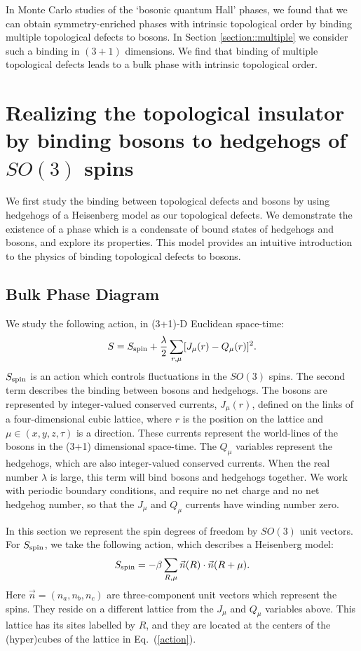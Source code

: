 \documentclass[prb,twocolumn]{revtex4-1}
\begin{document}
In Monte Carlo studies of the `bosonic quantum Hall' phases, we found that we can obtain symmetry-enriched phases with intrinsic topological order by binding multiple topological defects to bosons. In Section \ref{section::multiple} we consider such a binding in $(3+1)$ dimensions. We find that binding of multiple topological defects leads to a bulk phase with intrinsic topological order.

\section{Realizing the topological insulator by binding bosons to hedgehogs of $SO(3)$ spins}
\label{section::Heisenberg}

We first study the binding between topological defects and bosons by using hedgehogs of a Heisenberg model as our topological defects. We demonstrate the existence of a phase which is a condensate of bound states of hedgehogs and bosons, and explore its properties. This model provides an intuitive introduction to the physics of binding topological defects to bosons. 

\subsection{Bulk Phase Diagram}
\label{subsec::bulkheis}
We study the following action, in (3+1)-D Euclidean space-time:
\begin{equation}
S=S_{\rm spin}+\frac{\lambda}{2}\sum_{r,\mu} [ J_\mu(r)- Q_\mu(r)]^2.
\label{action}
\end{equation}
$S_{\rm spin}$ is an action which controls fluctuations in the $SO(3)$ spins. The second term describes the binding between bosons and hedgehogs. The bosons are represented by integer-valued conserved currents, $J_\mu(r)$, defined on the links of a four-dimensional cubic lattice, where $r$ is the position on the lattice and $\mu\in (x,y,z,\tau)$ is a direction. These currents represent the world-lines of the bosons in the (3+1) dimensional space-time. The $Q_\mu$ variables represent the hedgehogs, which are also integer-valued conserved currents.  When the real number $\lambda$ is large, this term will bind bosons and hedgehogs together. We work with periodic boundary conditions, and require no net charge and no net hedgehog number, so that the $J_\mu$ and $Q_\mu$ currents have winding number zero.

In this section we represent the spin degrees of freedom by $SO(3)$ unit vectors. For $S_{\rm spin}$, we take the following action, which describes a Heisenberg model:
\begin{equation}
S_{\rm spin}=-\beta\sum_{R,\mu} \vec{n}(R)\cdot \vec{n}(R+\mu).
\end{equation}
Here $\vec{n}=(n_a,n_b,n_c)$ are three-component unit vectors which represent the spins. They reside on a different lattice from the $J_\mu$ and $Q_\mu$ variables above. This lattice has its sites labelled by $R$, and they are located at the centers of the (hyper)cubes of the lattice in Eq.~(\ref{action}). 
\end{document}
